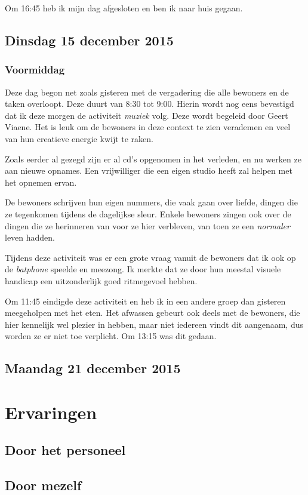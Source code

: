 \documentclass[a4paper,12pt]{article}
\begin{document}
Om 16:45 heb ik mijn dag afgesloten en ben ik naar huis gegaan.

\subsection{Dinsdag 15 december 2015}

\subsubsection{Voormiddag}

Deze dag begon net zoals gisteren met de vergadering die alle bewoners en de taken overloopt. Deze duurt van 8:30 tot 9:00. Hierin wordt nog eens bevestigd dat ik deze morgen de activiteit \emph{muziek} volg. Deze wordt begeleid door Geert Viaene. Het is leuk om de bewoners in deze context te zien verademen en veel van hun creatieve energie kwijt te raken.

Zoals eerder al gezegd zijn er al cd's opgenomen in het verleden, en nu werken ze aan nieuwe opnames. Een vrijwilliger die een eigen studio heeft zal helpen met het opnemen ervan.

De bewoners schrijven hun eigen nummers, die vaak gaan over liefde, dingen die ze tegenkomen tijdens de dagelijkse sleur. Enkele bewoners zingen ook over de dingen die ze herinneren van voor ze hier verbleven, van toen ze een \emph{normaler} leven hadden.

Tijdens deze activiteit was er een grote vraag vanuit de bewoners dat ik ook op de \emph{batphone} speelde en meezong. Ik merkte dat ze door hun meestal visuele handicap een uitzonderlijk goed ritmegevoel hebben.

Om 11:45 eindigde deze activiteit en heb ik in een andere groep dan gisteren meegeholpen met het eten. Het afwassen gebeurt ook deels met de bewoners, die hier kennelijk wel plezier in hebben, maar niet iedereen vindt dit aangenaam, dus worden ze er niet toe verplicht. Om 13:15 was dit gedaan.

\subsection{Maandag 21 december 2015}

\section{Ervaringen}

\subsection{Door het personeel}

\subsection{Door mezelf}
\end{document}
